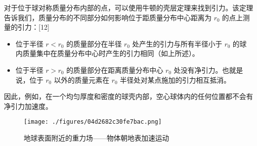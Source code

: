 对于位于球对称质量分布内部的点，可以使用牛顿的壳层定理来找到引力。该定理告诉我们，质量分布的不同部分如何影响位于距质量分布中心距离为 \( r_0 \) 的点上测量的引力：[12]
\begin{itemize}
\item 位于半径 \( r < r_0 \) 的质量部分在半径 \( r_0 \) 处产生的引力与所有半径小于 \( r_0 \) 的球内质量集中在质量分布中心时产生的引力相同（如上所述）。

\item 位于半径 \( r > r_0 \) 的质量部分在距离质量分布中心 \( r_0 \) 处没有净引力。也就是说，位于 \( r_0 \) 以外的质量元素在 \( r_0 \) 半径处对某点施加的引力相互抵消。
\end{itemize}

因此，例如，在一个均匀厚度和密度的球壳内部，空心球体内的任何位置都不会有净引力加速度。
\begin{figure}[ht]
\centering
\texttt{[image: ./figures/04d2682c30fe7bac.png]}
\caption{地球表面附近的重力场——物体朝地表加速运动} \label{fig_NEWW_4}
\end{figure}